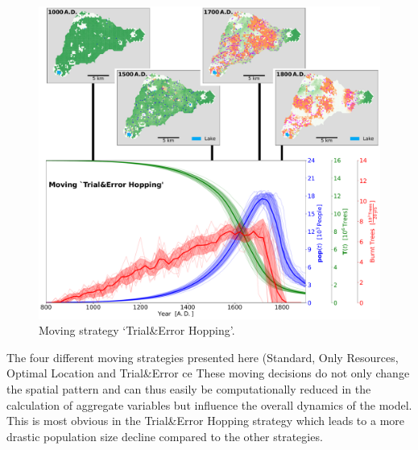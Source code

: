 \begin{figure}
	\centering
	\includegraphics[width=1\textwidth]{images/Results/Moving/alphaHopping_EnsembleStatistics+Panels}
	\caption{Moving strategy `Trial\&Error Hopping'.}
	\label{fig:hop}
\end{figure}
The four different moving strategies presented here (Standard, Only Resources, Optimal Location and Trial\&Error ce 
These moving decisions do not only change the spatial pattern and can thus easily be computationally reduced in the calculation of aggregate variables but influence the overall dynamics of the model.
This is most obvious in the Trial\&Error Hopping strategy which leads to a more drastic population size decline compared to the other strategies.




